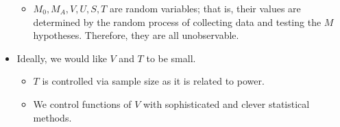 \begin{itemize}
\begin{itemize}
                  \item $ M_0,M_A,V,U,S,T $ are random variables; that is, their values are
                        determined by the random process of collecting data and testing the $ M $
                        hypotheses. Therefore, they are all unobservable.
            \end{itemize}
      \item Ideally, we would like $ V $ and $ T $ to be small.
            \begin{itemize}
                  \item $ T $ is controlled via sample size as it is related to power.
                  \item We control functions of $ V $ with sophisticated and clever statistical methods.
            \end{itemize}
\end{itemize}
